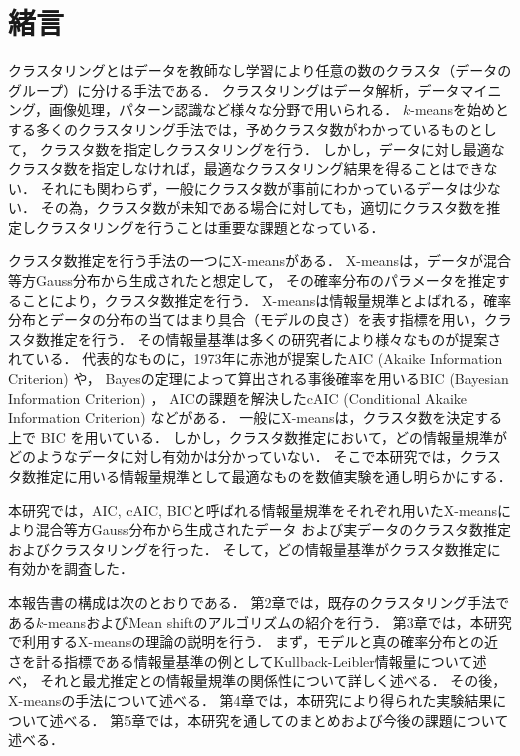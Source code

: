 \section{緒言}
クラスタリングとはデータを教師なし学習により任意の数のクラスタ（データのグループ）に分ける手法である．
クラスタリングはデータ解析，データマイニング，画像処理，パターン認識など様々な分野で用いられる．
$k$-meansを始めとする多くのクラスタリング手法では，予めクラスタ数がわかっているものとして，
クラスタ数を指定しクラスタリングを行う．
しかし，データに対し最適なクラスタ数を指定しなければ，最適なクラスタリング結果を得ることはできない．
それにも関わらず，一般にクラスタ数が事前にわかっているデータは少ない．
その為，クラスタ数が未知である場合に対しても，適切にクラスタ数を推定しクラスタリングを行うことは重要な課題となっている．

クラスタ数推定を行う手法の一つにX-meansがある．
X-meansは，データが混合等方Gauss分布から生成されたと想定して，
その確率分布のパラメータを推定することにより，クラスタ数推定を行う．
X-meansは情報量規準とよばれる，確率分布とデータの分布の当てはまり具合（モデルの良さ）を表す指標を用い，クラスタ数推定を行う．
その情報量基準は多くの研究者により様々なものが提案されている．
代表的なものに，1973年に赤池が提案したAIC (Akaike Information Criterion) や，
Bayesの定理によって算出される事後確率を用いるBIC (Bayesian Information Criterion) ，
AICの課題を解決したcAIC (Conditional Akaike Information Criterion) などがある．
一般にX-meansは，クラスタ数を決定する上で BIC を用いている．
しかし，クラスタ数推定において，どの情報量規準がどのようなデータに対し有効かは分かっていない．
そこで本研究では，クラスタ数推定に用いる情報量規準として最適なものを数値実験を通し明らかにする．

本研究では，AIC, cAIC, BICと呼ばれる情報量規準をそれぞれ用いたX-meansにより混合等方Gauss分布から生成されたデータ
および実データのクラスタ数推定およびクラスタリングを行った．
そして，どの情報量基準がクラスタ数推定に有効かを調査した．

本報告書の構成は次のとおりである．
第2章では，既存のクラスタリング手法である$k$-meansおよびMean shiftのアルゴリズムの紹介を行う．
第3章では，本研究で利用するX-meansの理論の説明を行う．
まず，モデルと真の確率分布との近さを計る指標である情報量基準の例としてKullback-Leibler情報量について述べ，
それと最尤推定との情報量規準の関係性について詳しく述べる．
その後，X-meansの手法について述べる．
第4章では，本研究により得られた実験結果について述べる．
第5章では，本研究を通してのまとめおよび今後の課題について述べる．
